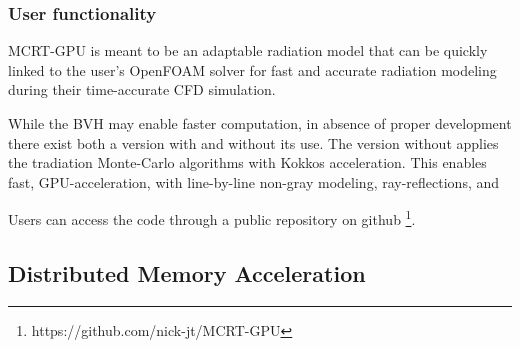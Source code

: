 \subsubsection{User functionality}
MCRT-GPU is meant to be an adaptable radiation model that can be quickly linked to the user's OpenFOAM solver for fast and accurate radiation modeling during their time-accurate CFD simulation.

While the BVH may enable faster computation, in absence of proper development there exist both a version with and without its use.
The version without applies the tradiation Monte-Carlo algorithms with Kokkos acceleration. This enables fast, GPU-acceleration, with line-by-line non-gray modeling, ray-reflections, and 

Users can access the code through a public repository on github \footnote{https://github.com/nick-jt/MCRT-GPU}.

\subsection{Distributed Memory Acceleration}\label{DistMemAccel}
